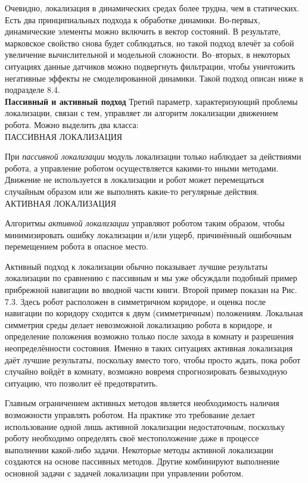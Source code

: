 \documentclass[10pt,a4paper]{article}
\begin{document}
Очевидно, локализация в динамических средах более трудна, чем в статических. Есть два принципиальных подхода к обработке динамики. Во-первых, динамические элементы можно включить в вектор состояний. В результате, марковское свойство снова будет соблюдаться, но такой подход влечёт за собой увеличение вычислительной и модельной сложности. Во–вторых, в некоторых ситуациях данные датчиков можно подвергнуть фильтрации, чтобы уничтожить негативные эффекты не смоделированной динамики. Такой подход описан ниже в подразделе 8.4.\\

\textbf{Пассивный и активный подход} Третий параметр, характеризующий проблемы локализации, связан с тем, управляет ли алгоритм локализации движением робота. Можно выделить два класса:\\
ПАССИВНАЯ ЛОКАЛИЗАЦИЯ 

При \textit{пассивной локализации} модуль локализации только наблюдает за действиями робота, а управление роботом осуществляется какими-то иными методами. Движение не используется в локализации и робот может перемещаться случайным образом или же выполнять какие-то регулярные действия.\\ 
АКТИВНАЯ ЛОКАЛИЗАЦИЯ 

Алгоритмы \textit{активной локализации} управляют роботом таким образом, чтобы минимизировать ошибку локализации и/или ущерб, причинённый ошибочным перемещением робота в опасное место. 

Активный подход к локализации обычно показывает лучшие результаты локализации по сравнению с пассивным и мы уже обсуждали подобный пример прибрежной навигации во вводной части книги. Второй пример показан на Рис. 7.3. Здесь робот расположен в симметричном коридоре, и оценка после навигации по коридору сходится к двум (симметричным) положениям. Локальная симметрия среды делает невозможной локализацию робота в коридоре, и определение положения возможно только после захода в комнату и разрешения неопределённости состояния. Именно в таких ситуациях активная локализация даёт лучшие результаты, поскольку вместо того, чтобы просто ждать, пока робот случайно войдёт в комнату, возможно вовремя спрогнозировать безвыходную ситуацию, что позволит её предотвратить. 

Главным ограничением активных методов является необходимость наличия возможности управлять роботом. На практике это требование делает использование одной лишь активной локализации недостаточным, поскольку роботу необходимо определять своё местоположение даже в процессе выполнении какой-либо задачи. Некоторые методы активной локализации создаются на основе пассивных методов. Другие комбинируют выполнение основной задачи с задачей локализации при управлении роботом. 
\end{document}
